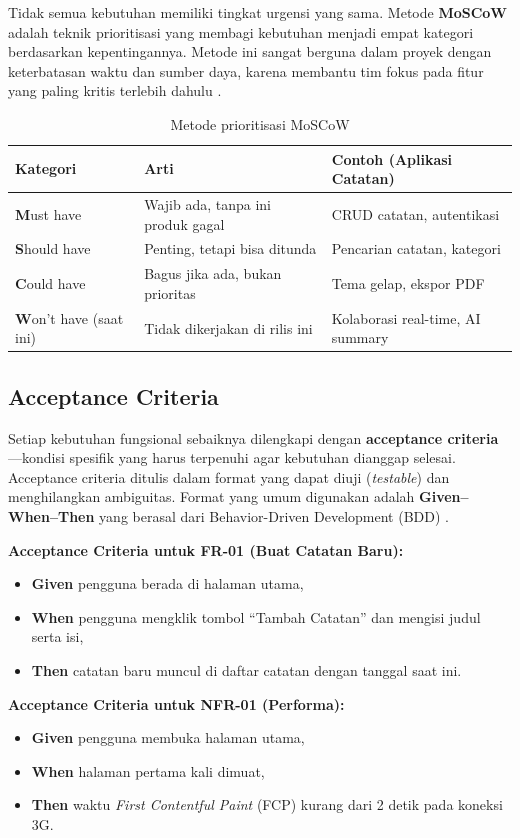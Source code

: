 Tidak semua kebutuhan memiliki tingkat urgensi yang sama. Metode \textbf{MoSCoW} adalah teknik prioritisasi yang membagi kebutuhan menjadi empat kategori berdasarkan kepentingannya. Metode ini sangat berguna dalam proyek dengan keterbatasan waktu dan sumber daya, karena membantu tim fokus pada fitur yang paling kritis terlebih dahulu \cite{webdevLearn}.

\begin{table}[htbp]
\centering
\begin{tabular}{|P{3cm}|P{4cm}|P{5cm}|}
\hline
\textbf{Kategori} & \textbf{Arti} & \textbf{Contoh (Aplikasi Catatan)} \\
\hline
\textbf{M}ust have & Wajib ada, tanpa ini produk gagal & CRUD catatan, autentikasi \\
\hline
\textbf{S}hould have & Penting, tetapi bisa ditunda & Pencarian catatan, kategori \\
\hline
\textbf{C}ould have & Bagus jika ada, bukan prioritas & Tema gelap, ekspor PDF \\
\hline
\textbf{W}on't have (saat ini) & Tidak dikerjakan di rilis ini & Kolaborasi real-time, AI summary \\
\hline
\end{tabular}
\caption{Metode prioritisasi MoSCoW}
\end{table}

\subsection{Acceptance Criteria}

Setiap kebutuhan fungsional sebaiknya dilengkapi dengan \textbf{acceptance criteria}---kondisi spesifik yang harus terpenuhi agar kebutuhan dianggap selesai. Acceptance criteria ditulis dalam format yang dapat diuji (\textit{testable}) dan menghilangkan ambiguitas. Format yang umum digunakan adalah \textbf{Given--When--Then} yang berasal dari Behavior-Driven Development (BDD) \cite{mdnLearn}.

\begin{contoh}
\textbf{Acceptance Criteria untuk FR-01 (Buat Catatan Baru):}
\begin{itemize}
  \item \textbf{Given} pengguna berada di halaman utama,
  \item \textbf{When} pengguna mengklik tombol ``Tambah Catatan'' dan mengisi judul serta isi,
  \item \textbf{Then} catatan baru muncul di daftar catatan dengan tanggal saat ini.
\end{itemize}

\textbf{Acceptance Criteria untuk NFR-01 (Performa):}
\begin{itemize}
  \item \textbf{Given} pengguna membuka halaman utama,
  \item \textbf{When} halaman pertama kali dimuat,
  \item \textbf{Then} waktu \textit{First Contentful Paint} (FCP) kurang dari 2 detik pada koneksi 3G.
\end{itemize}
\end{contoh}

